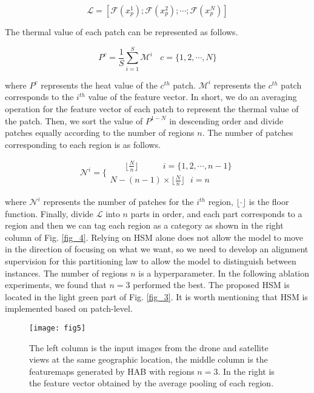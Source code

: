 \documentclass[lettersize,journal]{IEEEtran}
\begin{document}
\begin{equation}
\label{eq2}
\mathcal{L}=[\mathcal{F}(x_p^1);\mathcal{F}(x_p^2);\cdots{};\mathcal{F}(x_p^N)]
\end{equation}

The thermal value of each patch can be represented as follows.

\begin{equation}
\label{eq3}
P^c=\frac{1}{S}\textstyle\sum_{i=1}^S{\mathcal{M}^i} \ \ \ \ c=\{1,2,\cdots{},N\}
\end{equation}



where $P^c$ represents the heat value of the $c^{th}$ patch. $\mathcal{M}^i$ represents the  $c^{th}$ patch corresponds to the  $i^{th}$ value of the feature vector. In short, we do an averaging operation for the feature vector of each patch to represent the thermal value of the patch. Then, we sort the value of $P^{1-N}$ in descending order and divide patches equally according to the number of regions $n$. The number of patches corresponding to each region is as follows.

\begin{equation}
\label{eq4}
\mathcal{N}^i=\{
\begin{array}{l}\ \ \ \ \ \ \ \ 
\lfloor{}\frac{N}{n}\rfloor{}\ \ \ \ \ \ \ \ \ \ \ \ \ 
i=\{1,2,\cdots{},n-1\} \\
N-(n-1)\times{}\lfloor{}\frac{N}{n}\rfloor{}\ \ 
\ i=n
\end{array}
\end{equation}


where $\mathcal{N}^i$ represents the number of patches for the $i^{th}$ region, $\lfloor{}\cdot\rfloor{}$ is the floor function. Finally, divide $\mathcal{L}$ into $n$ parts in order, and each part corresponds to a region and then we can tag each region as a category as shown in the right column of Fig. \ref{fig_4}. Relying on HSM alone does not allow the model to move in the direction of focusing on what we want, so we need to develop an alignment supervision for this partitioning law to allow the model to distinguish between instances. The number of regions $n$ is a hyperparameter. In the following ablation experiments, we found that $n=3$ performed the best. The proposed HSM is located in the light green part of Fig. \ref{fig_3}. It is worth mentioning that HSM is implemented based on patch-level.

\begin{figure}[!t]
\centering
\texttt{[image: fig5]}
\caption{ The left column is the input images from the drone and satellite views at the same geographic location, the middle column is the featuremaps generated by HAB with regions $n=3$. In the right is the feature vector obtained by the average pooling of each region.}
\label{fig_5}
\end{figure}
\end{document}
